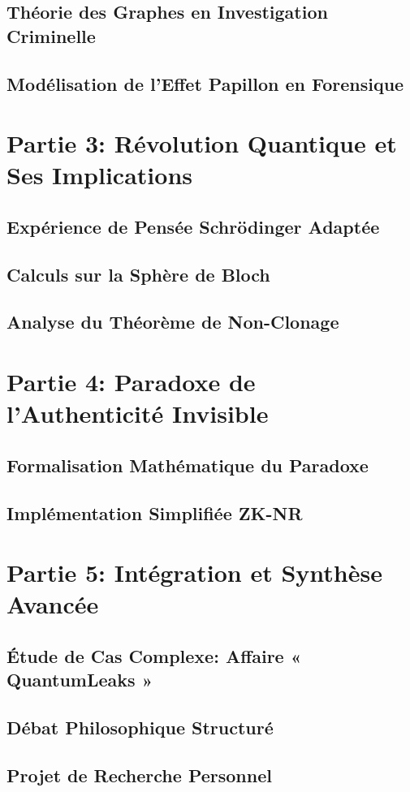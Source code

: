 \documentclass[12pt, a4paper]{article}
\begin{document}
\subsection{Théorie des Graphes en Investigation Criminelle}
\subsection{Modélisation de l’Effet Papillon en Forensique}
\section*{Partie 3: Révolution Quantique et Ses Implications}
\subsection{Expérience de Pensée Schrödinger Adaptée}
\subsection{Calculs sur la Sphère de Bloch}
\subsection{Analyse du Théorème de Non-Clonage}
\section*{Partie 4: Paradoxe de l’Authenticité Invisible}
\subsection{Formalisation Mathématique du Paradoxe}
\subsection{Implémentation Simplifiée ZK-NR}
\section*{Partie 5: Intégration et Synthèse Avancée}
\subsection{Étude de Cas Complexe: Affaire « QuantumLeaks »}
\subsection{Débat Philosophique Structuré}
\subsection{Projet de Recherche Personnel}
\end{document}

